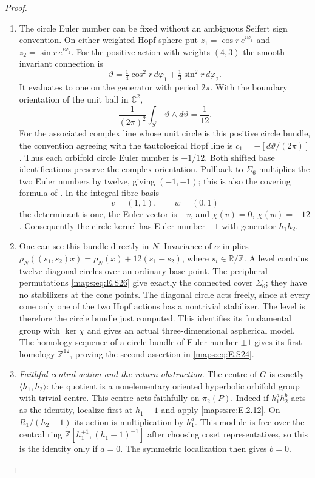 \begin{proof}
\begin{enumerate}[label=\arabic*.,leftmargin=*]
\item The circle Euler number can be fixed without an ambiguous
Seifert sign convention. On either weighted Hopf sphere put
$z_1=\cos r\,e^{i\varphi_1}$ and
$z_2=\sin r\,e^{i\varphi_2}$. For the positive action with
weights $(4,3)$ the smooth invariant connection is
\[
 \vartheta=\tfrac14\cos^2r\,d\varphi_1
                    +\tfrac13\sin^2r\,d\varphi_2.
\]
It evaluates to one on the generator with period $2\pi$.
With the boundary orientation of the unit ball in $\mathbb C^2$,
\[
             \frac1{(2\pi)^2}\int_{S^3}\vartheta\wedge d\vartheta
                         =\frac1{12}.
 \tag{E.S28}\label{maps:eq:E.S28}
\]
For the associated complex line whose unit circle is this
positive circle bundle, the convention agreeing with the
tautological Hopf line is $c_1=-[d\vartheta/(2\pi)]$.
Thus each orbifold circle Euler number is $-1/12$.
Both shifted base identifications preserve the complex
orientation. Pullback to $\Sigma_6$ multiplies the two Euler
numbers by twelve, giving $(-1,-1)$; this is also the
covering formula of \cite[Theorem 3.6]{rootScott83}.
In the integral fibre basis
\[
                  v=(1,1),\qquad w=(0,1)
\]
the determinant is one, the Euler vector is $-v$, and
$\chi(v)=0$, $\chi(w)=-12$. Consequently the circle kernel
has Euler number $-1$ with generator $h_1h_2$.

\item One can see this bundle directly in $N$. Invariance of
$\alpha$ implies
$\rho_N((s_1,s_2)x)=\rho_N(x)+12(s_1-s_2)$, where
$s_i\in\mathbb R/\mathbb Z$. A level contains twelve
diagonal circles over an ordinary base point. The peripheral
permutations \eqref{maps:eq:E.S26} give exactly the connected cover
$\Sigma_6$; they have no stabilizers at the cone points.
The diagonal circle acts freely, since at every cone only
one of the two Hopf actions has a nontrivial stabilizer.
The level is therefore the circle bundle just computed.
This identifies its fundamental group with $\ker\chi$
and gives an actual three-dimensional aspherical model.
The homology sequence of a circle bundle of Euler number
$\pm1$ gives its first homology $\mathbb Z^{12}$, proving
the second assertion in \eqref{maps:eq:E.S24}.

\item \emph{Faithful central action and the return obstruction.}
The centre of $G$ is exactly $\langle h_1,h_2\rangle$:
the quotient is a nonelementary oriented hyperbolic orbifold
group with trivial centre. This centre acts faithfully on
$\pi_2(P)$. Indeed if $h_1^a h_2^b$ acts as the identity,
localize first at $h_1-1$ and apply \ref{maps:src:E.2.12}. On
$R_1/(h_2-1)$ its action is multiplication by $h_1^a$.
This module is free over the central ring
$\mathbb Z[h_1^{\pm1},(h_1-1)^{-1}]$ after choosing coset
representatives, so this is the identity only if $a=0$.
The symmetric localization then gives $b=0$.


\end{enumerate}
\end{proof}
